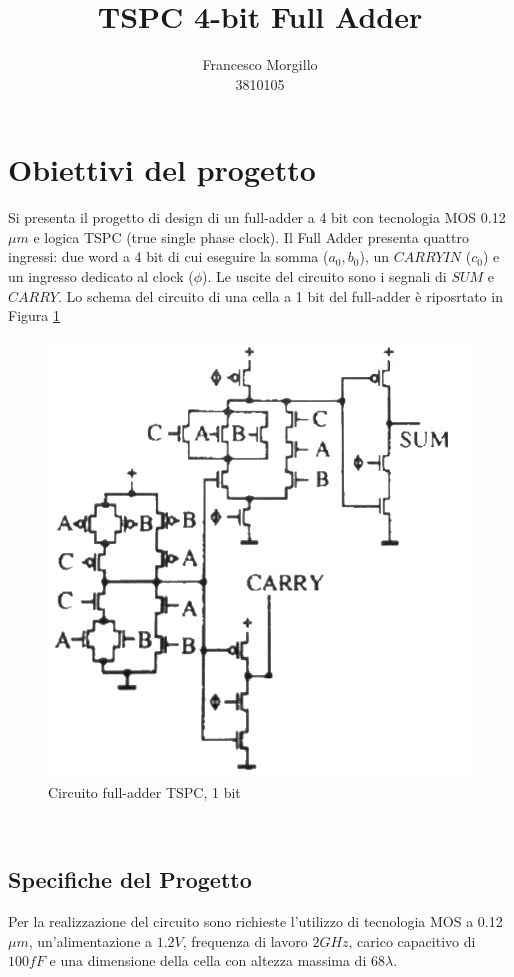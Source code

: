 \documentclass[11pt]{article} %
\title{TSPC 4-bit Full Adder}
\author{Francesco Morgillo\\3810105}
\begin{document}
\maketitle

\section{Obiettivi del progetto }
Si presenta il progetto di design di un full-adder a 4 bit con tecnologia MOS 0.12 $\mu m$ e logica TSPC (true single phase clock). 
Il Full Adder presenta quattro ingressi: due word a 4 bit di cui eseguire la somma ($a_{0},b_{0}$), un $CARRY IN$ ($ c_{0}$) e un ingresso dedicato al clock ($\phi$).
Le uscite del circuito sono i segnali di $SUM$ e $CARRY$.
Lo schema del circuito di una cella a 1 bit del full-adder è riposrtato in Figura \ref{fig:Schematic}
\begin{figure}[h!]
  \includegraphics[scale=0.75]{Schematic.png}
  \caption{Circuito full-adder TSPC, 1 bit}
  \label{fig:Schematic}
\end{figure}

\

\subsection{Specifiche del Progetto}
Per la realizzazione del circuito sono richieste l'utilizzo di tecnologia MOS a 0.12 $\mu m$, un'alimentazione a $1.2V$, frequenza di lavoro $2GHz$,  carico capacitivo di $100fF$ e una dimensione della cella con altezza massima di 68$\lambda$.
\end{document}
